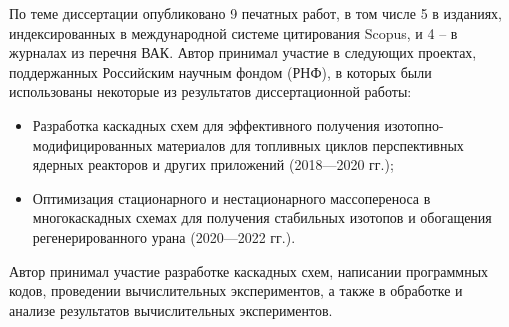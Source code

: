 По теме диссертации опубликовано 9 печатных работ, в том числе 5 в изданиях, индексированных в международной системе цитирования Scopus, и 4 -- в журналах из перечня ВАК. Автор принимал участие в следующих проектах, поддержанных Российским научным фондом (РНФ), в которых были использованы некоторые из результатов диссертационной работы: 
\begin{itemize}
  \item Разработка каскадных схем для эффективного получения изотопно-модифицированных материалов для топливных циклов перспективных ядерных реакторов и других приложений (2018---2020 гг.);
  \item Оптимизация стационарного и нестационарного массопереноса в многокаскадных схемах для получения стабильных изотопов и обогащения регенерированного урана (2020---2022 гг.).
\end{itemize}


{\contribution} Автор принимал участие разработке каскадных схем, написании программных кодов, проведении вычислительных экспериментов, а также в обработке и анализе результатов вычислительных экспериментов.
